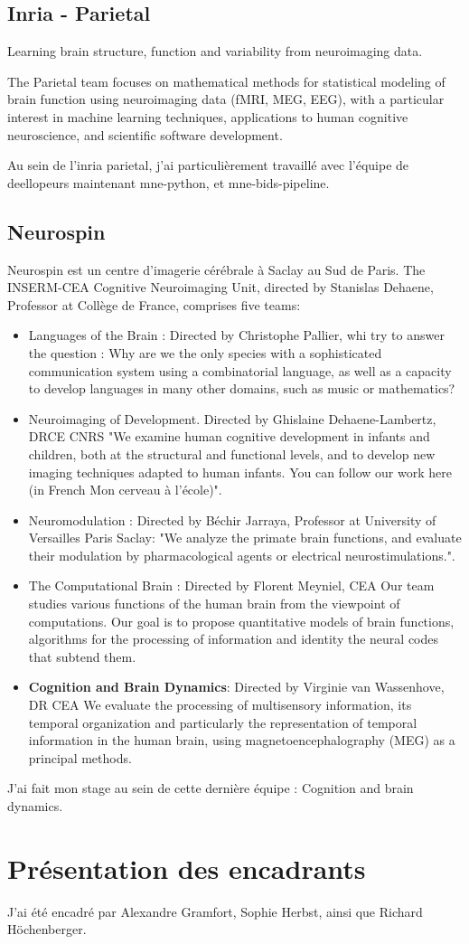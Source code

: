 \section{Inria - Parietal}

Learning brain structure, function and variability from neuroimaging data.

The Parietal team focuses on mathematical methods for statistical modeling of brain function using neuroimaging data (fMRI, MEG, EEG), with a particular interest in machine learning techniques, applications to human cognitive neuroscience, and scientific software development.


Au sein de l'inria parietal, j'ai particulièrement travaillé avec l'équipe de deellopeurs maintenant mne-python, et mne-bids-pipeline.

\section{Neurospin}

Neurospin est un centre d'imagerie cérébrale à Saclay au Sud de Paris. The INSERM-CEA Cognitive Neuroimaging Unit, directed by Stanislas Dehaene, Professor at Collège de France, comprises five teams:

\begin{itemize}
    \item Languages of the Brain : Directed by Christophe Pallier, whi try to answer the question : Why are we the only species with a sophisticated communication system using a combinatorial language, as well as a capacity to develop languages in many other domains, such as music or mathematics?
    \item Neuroimaging of Development. Directed by Ghislaine Dehaene-Lambertz, DRCE CNRS
    "We examine human cognitive development in infants and children, both at the structural and functional levels, and to develop new imaging techniques adapted to human infants.
    You can follow our work here (in French Mon cerveau à l’école)".
    \item Neuromodulation : Directed by Béchir Jarraya, Professor at University of Versailles Paris Saclay: "We analyze the primate brain functions, and evaluate their modulation by pharmacological agents or electrical neurostimulations.".
    \item The Computational Brain : Directed by Florent Meyniel, CEA
    Our team studies various functions of the human brain from the viewpoint of computations. Our goal is to propose quantitative models of brain functions, algorithms for the processing of information and identity the neural codes that subtend them.
    \item \textbf{Cognition and Brain Dynamics}: Directed by Virginie van Wassenhove, DR CEA
    We evaluate the processing of multisensory information, its temporal organization and particularly the representation of temporal information in the human brain, using magnetoencephalography (MEG) as a principal methods.
\end{itemize}

J'ai fait mon stage au sein de cette dernière équipe : Cognition and brain dynamics.


\chapter*{Présentation des encadrants}


J'ai été encadré par Alexandre Gramfort, Sophie Herbst, ainsi que Richard Höchenberger.
